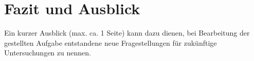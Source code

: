 \chapter{Fazit und Ausblick}

Ein kurzer Ausblick (max. ca. 1 Seite) kann dazu dienen, bei
Bearbeitung der gestellten Aufgabe entstandene neue Fragestellungen für zukünftige
Untersuchungen zu nennen.